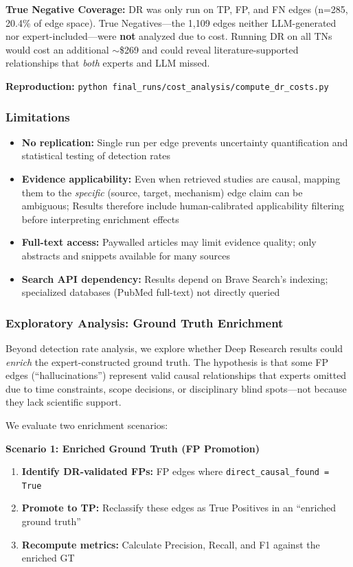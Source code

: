 \textbf{True Negative Coverage:} DR was only run on TP, FP, and FN edges (n=285, 20.4\% of edge space). True Negatives---the 1,109 edges neither LLM-generated nor expert-included---were \textbf{not} analyzed due to cost. Running DR on all TNs would cost an additional $\sim$\$269 and could reveal literature-supported relationships that \textit{both} experts and LLM missed.

\textbf{Reproduction:} \texttt{python final\_runs/cost\_analysis/compute\_dr\_costs.py}

\subsubsection{Limitations}

\begin{itemize}[noitemsep]
    \item \textbf{No replication:} Single run per edge prevents uncertainty quantification and statistical testing of detection rates
    \item \textbf{Evidence applicability:} Even when retrieved studies are causal, mapping them to the \textit{specific} (source, target, mechanism) edge claim can be ambiguous; Results therefore include human-calibrated applicability filtering before interpreting enrichment effects
    \item \textbf{Full-text access:} Paywalled articles may limit evidence quality; only abstracts and snippets available for many sources
    \item \textbf{Search API dependency:} Results depend on Brave Search's indexing; specialized databases (PubMed full-text) not directly queried
\end{itemize}

\subsubsection{Exploratory Analysis: Ground Truth Enrichment}
\label{sec:gt_enrichment_method}

Beyond detection rate analysis, we explore whether Deep Research results could \textit{enrich} the expert-constructed ground truth. The hypothesis is that some FP edges (``hallucinations'') represent valid causal relationships that experts omitted due to time constraints, scope decisions, or disciplinary blind spots---not because they lack scientific support.

We evaluate two enrichment scenarios:

\textbf{Scenario 1: Enriched Ground Truth (FP Promotion)}
\begin{enumerate}[noitemsep]
    \item \textbf{Identify DR-validated FPs:} FP edges where \texttt{direct\_causal\_found = True}
    \item \textbf{Promote to TP:} Reclassify these edges as True Positives in an ``enriched ground truth''
    \item \textbf{Recompute metrics:} Calculate Precision, Recall, and F1 against the enriched GT
\end{enumerate}

